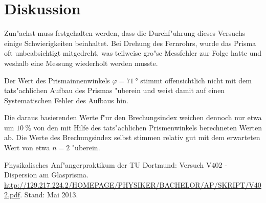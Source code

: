 \section{Diskussion}
\label{sec:diskussion}
	Zun"achst muss festgehalten werden, dass die Durchf"uhrung dieses Versuchs einige Schwierigkeiten beinhaltet.
	Bei Drehung des Fernrohrs, wurde das Prisma oft unbeabsichtigt mitgedreht, was teilweise gro"se Messfehler zur Folge hatte und weshalb eine Messung wiederholt werden musste.
	
	Der Wert des Prismainnenwinkels $\varphi = \SI{71}{\degree}$ stimmt offensichtlich nicht mit dem tats"achlichen Aufbau des Prismas "uberein und weist damit auf einen Systematischen Fehler des Aufbaus hin.

	Die daraus basierenden Werte f"ur den Brechungsindex weichen dennoch nur etwa um $\SI{10}{\percent}$ von den mit Hilfe des tats"achlichen Prismenwinkels berechneten Werten ab.
	Die Werte des Brechungsindex selbst stimmen relativ gut mit dem erwarteten Wert von etwa $n = 2$ "uberein.


\begin{thebibliography}{9}
	 Physikalisches Anf"angerpraktikum der TU Dortmund: Versuch V402 - Dispersion am Glasprisma. \url{http://129.217.224.2/HOMEPAGE/PHYSIKER/BACHELOR/AP/SKRIPT/V402.pdf}. Stand: Mai 2013.
\end{thebibliography}
